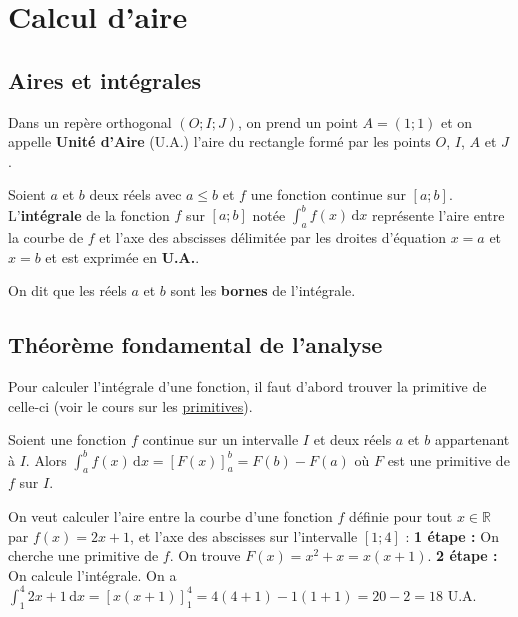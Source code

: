 



	\section{Calcul d'aire}

	\subsection{Aires et intégrales}

	Dans un repère orthogonal $(O; I; J)$, on prend un point $A = (1; 1)$ et on appelle \textbf{Unité d'Aire} (U.A.) l'aire du rectangle formé par les points $O$, $I$, $A$ et $J$.


	Soient $a$ et $b$ deux réels avec $a \leq b$ et $f$ une fonction continue sur $[a;b]$. L'\textbf{intégrale} de la fonction $f$ sur $[a;b]$ notée
	$\displaystyle{\int_{a}^{b} f(x) \, \mathrm{d}x}$ représente l'aire entre la courbe de $f$ et l'axe des abscisses délimitée par les droites d'équation $x = a$ et $x = b$
	et est exprimée en \textbf{U.A.}.


	On dit que les réels $a$ et $b$ sont les \textbf{bornes} de l'intégrale.

	\subsection{Théorème fondamental de l'analyse}

	Pour calculer l'intégrale d'une fonction, il faut d'abord trouver la primitive de celle-ci (voir le cours sur les \href{https://bacomathiqu.es/cours/terminale/primitives-equations-differentielles/}{primitives}).

	\begin{formula}
		Soient une fonction $f$ continue sur un intervalle $I$ et deux réels $a$ et $b$ appartenant à $I$.
		\newpar
		Alors $\displaystyle{\int_{a}^{b} f(x) \, \mathrm{d}x = \left[ F(x) \right]_a^b = F(b) - F(a)}$ où $F$ est une primitive de $f$ sur $I$.
	\end{formula}

	\begin{tip}[Exemple]
		On veut calculer l'aire entre la courbe d'une fonction $f$ définie pour tout $x \in \mathbb{R}$ par $f(x) = 2x + 1$, et l'axe des abscisses sur l'intervalle $[1;4]$ :
		\newpar
		\textbf{1\iere{} étape :} On cherche une primitive de $f$. On trouve $F(x) = x^2 + x = x(x + 1)$.
		\newpar
		\textbf{2\ieme{} étape :} On calcule l'intégrale.
		On a $\displaystyle{\int_{1}^{4} 2x + 1 \, \mathrm{d}x} = \left[ x(x + 1) \right]_1^4 = 4(4 + 1) - 1(1 + 1) = 20 - 2 = 18$ U.A.
		\newpar
	\end{tip}

